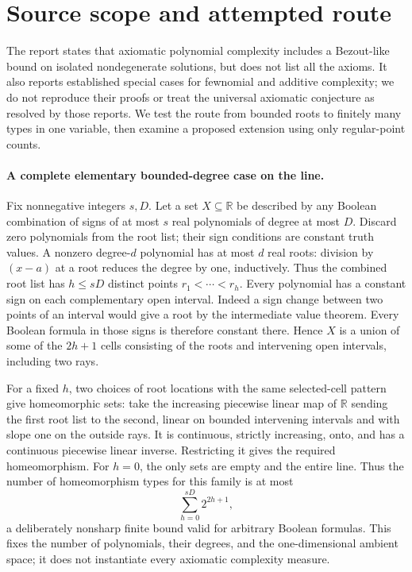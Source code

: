 \documentclass[11pt]{article}
\begin{document}
\section{Source scope and attempted route}
The report states that axiomatic polynomial complexity includes a Bezout-like
bound on isolated nondegenerate solutions, but does not list all the axioms.
It also reports established special cases for fewnomial and additive complexity;
we do not reproduce their proofs or treat the universal axiomatic conjecture
as resolved by those reports. We test the route from bounded roots to finitely
many types in one variable, then examine a proposed extension using only
regular-point counts.

\paragraph{A complete elementary bounded-degree case on the line.}
Fix nonnegative integers $s,D$. Let a set $X\subseteq\mathbb R$ be described
by any Boolean combination of signs of at most $s$ real polynomials of degree
at most $D$. Discard zero polynomials from the root list; their sign conditions
are constant truth values. A nonzero degree-$d$ polynomial has at most $d$
real roots: division by $(x-a)$ at a root reduces the degree by one, inductively.
Thus the combined root list has $h\le sD$ distinct points
$r_1<\cdots<r_h$.
Every polynomial has a constant sign on each complementary open interval.
Indeed a sign change between two points of an interval would give a root by
the intermediate value theorem. Every Boolean formula in those signs is
therefore constant there. Hence $X$ is a union of some of the $2h+1$ cells
consisting of the roots and intervening open intervals, including two rays.

For a fixed $h$, two choices of root locations with the same selected-cell
pattern give homeomorphic sets: take the increasing piecewise linear map of
$\mathbb R$ sending the first root list to the second, linear on bounded
intervening intervals and with slope one on the outside rays. It is continuous,
strictly increasing, onto, and has a continuous piecewise linear inverse.
Restricting it gives the required homeomorphism. For $h=0$, the only sets are
empty and the entire line. Thus the number of homeomorphism types for this
family is at most
\[
\sum_{h=0}^{sD}2^{2h+1},
\]
a deliberately nonsharp finite bound valid for arbitrary Boolean formulas.
This fixes the number of polynomials, their degrees, and the one-dimensional
ambient space; it does not instantiate every axiomatic complexity measure.
\end{document}
